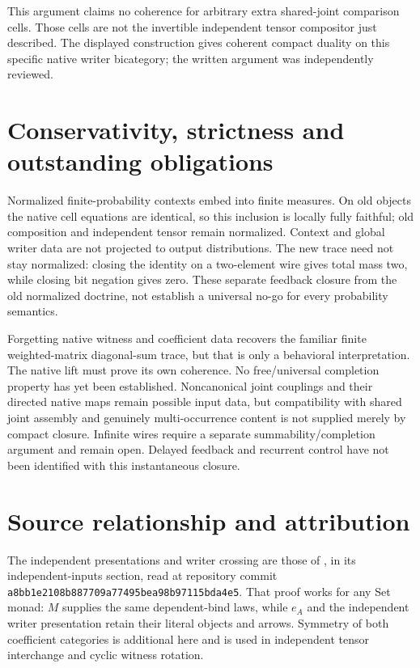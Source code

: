 \documentclass{article}
\begin{document}
This argument claims no coherence for arbitrary extra shared-joint comparison cells. Those cells are not the invertible independent tensor compositor just described. The displayed construction gives coherent compact duality on this specific native writer bicategory; the written argument was independently reviewed.

\section{Conservativity, strictness and outstanding obligations}
Normalized finite-probability contexts embed into finite measures. On old objects the native cell equations are identical, so this inclusion is locally fully faithful; old composition and independent tensor remain normalized. Context and global writer data are not projected to output distributions. The new trace need not stay normalized: closing the identity on a two-element wire gives total mass two, while closing bit negation gives zero. These separate feedback closure from the old normalized doctrine, not establish a universal no-go for every probability semantics.

Forgetting native witness and coefficient data recovers the familiar finite weighted-matrix diagonal-sum trace, but that is only a behavioral interpretation. The native lift must prove its own coherence. No free/universal completion property has yet been established. Noncanonical joint couplings and their directed native maps remain possible input data, but compatibility with shared joint assembly and genuinely multi-occurrence content is not supplied merely by compact closure. Infinite wires require a separate summability/completion argument and remain open. Delayed feedback and recurrent control have not been identified with this instantaneous closure.
\section{Source relationship and attribution}
The independent presentations and writer crossing are those of
,
in its independent-inputs section, read at repository commit
\texttt{a8bb1e2108b887709a77495bea98b97115bda4e5}. That proof works for any Set monad: $M$ supplies the same dependent-bind laws, while $e_A$ and the independent writer presentation retain their literal objects and arrows. Symmetry of both coefficient categories is additional here and is used in independent tensor interchange and cyclic witness rotation.
\end{document}

